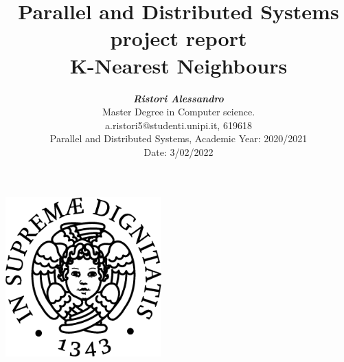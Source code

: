 \documentclass[11pt, letterpaper]{article}  %
\title{\vspace{-2cm}\textbf{Parallel and Distributed Systems project report\\K-Nearest Neighbours}}
\author{\textbf{\small{\textit{Ristori Alessandro}}} \\ %
        \small{Master Degree in Computer science.}\\ \small{{a.ristori5@studenti.unipi.it, 619618}} \\  %
        \small{Parallel and Distributed Systems, Academic Year: 2020/2021} \\
        \small{Date: 3/02/2022} \\
}
\begin{document}
\nocite{*}  %
\date{}
\maketitle
\begin{center}
    \includegraphics[width=0.45\textwidth]{images/unipi.png}\\
    \vspace{0.5cm}
\end{center}
\thispagestyle{empty}
\newpage
\tableofcontents
\thispagestyle{empty}
\newpage
{}






\end{document}
